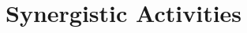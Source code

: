 \documentclass[../preamble.tex]{subfiles}
\begin{document}
\section{Synergistic Activities}


\end{document}
